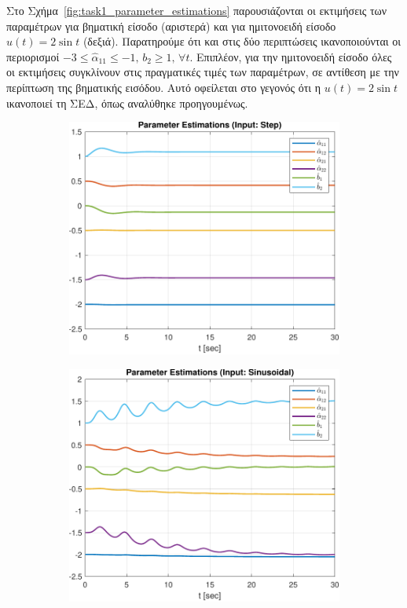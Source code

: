 \documentclass[a4paper,12pt]{article}
\begin{document}
Στο Σχήμα~\ref{fig:task1_parameter_estimations} παρουσιάζονται οι εκτιμήσεις των παραμέτρων για βηματική είσοδο 
(αριστερά) και για ημιτονοειδή είσοδο $u(t) = 2 \sin t$ (δεξιά). Παρατηρούμε ότι και στις δύο περιπτώσεις 
ικανοποιούνται οι περιορισμοί $-3 \leq \hat{\alpha}_{11} \leq -1, \, b_2 \geq 1, \, \forall t$. 
Επιπλέον, για την ημιτονοειδή είσοδο όλες οι εκτιμήσεις συγκλίνουν στις πραγματικές τιμές των παραμέτρων, 
σε αντίθεση με την περίπτωση της βηματικής εισόδου. Αυτό οφείλεται στο γεγονός ότι η $u(t) = 2 \sin t$ 
ικανοποιεί τη ΣΕΔ, όπως αναλύθηκε προηγουμένως.

\begin{figure}[htbp]
  \centering
  \begin{subfigure}[b]{0.45\textwidth}
    \centering
    \includegraphics[width=\textwidth]{plot/task1_parameter_estimations_step.pdf}
    \caption{}
    \label{fig:task1_parameter_estimations_step}
  \end{subfigure}
  \hfill
  \begin{subfigure}[b]{0.45\textwidth}
    \centering
    \includegraphics[width=\textwidth]{plot/task1_parameter_estimations_sinusoidal.pdf}

\end{subfigure}
\end{figure}
\end{document}
